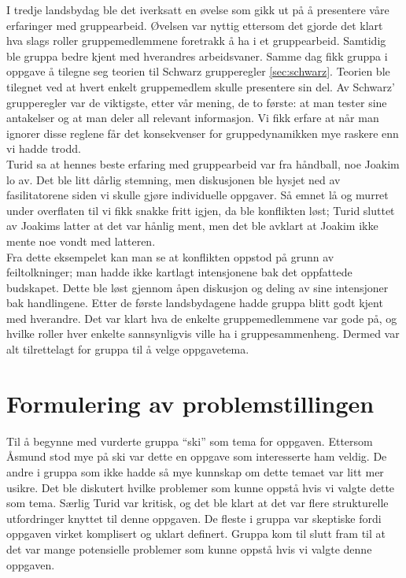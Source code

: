 I tredje landsbydag ble det iverksatt en øvelse som gikk ut på å presentere våre
erfaringer med gruppearbeid. Øvelsen var nyttig ettersom det gjorde det klart
hva slags roller gruppemedlemmene foretrakk å ha i et gruppearbeid. Samtidig ble
gruppa bedre kjent med hverandres arbeidsvaner. Samme dag fikk gruppa i oppgave
å tilegne seg teorien til Schwarz grupperegler \cref{sec:schwarz}. Teorien ble
tilegnet ved at hvert enkelt gruppemedlem skulle presentere sin del. Av
Schwarz’ grupperegler var de viktigste, etter vår mening, de to første: at
man tester sine antakelser og at man deler all relevant informasjon.  Vi fikk
erfare at når man ignorer disse reglene får det konsekvenser for
gruppedynamikken mye raskere enn vi hadde trodd. \\

Turid sa at hennes beste erfaring med gruppearbeid var fra håndball, noe Joakim
lo av. Det ble litt dårlig stemning, men diskusjonen ble hysjet ned av
fasilitatorene siden vi skulle gjøre individuelle oppgaver. Så emnet lå og
murret under overflaten til vi fikk snakke fritt igjen, da ble konflikten løst;
Turid sluttet av Joakims latter at det var hånlig ment, men det ble avklart at
Joakim ikke mente noe vondt med latteren.\\

Fra dette eksempelet kan man se at konflikten oppstod på grunn av
feiltolkninger; man hadde ikke kartlagt intensjonene bak det oppfattede
budskapet. Dette ble løst gjennom åpen diskusjon og deling av sine intensjoner
bak handlingene.  Etter de første landsbydagene hadde gruppa blitt godt kjent
med hverandre. Det var klart hva de enkelte gruppemedlemmene var gode på, og
hvilke roller hver enkelte sannsynligvis ville ha i gruppesammenheng. Dermed var
alt tilrettelagt for gruppa til å velge oppgavetema.\\

\section{Formulering av problemstillingen}
Til å begynne med vurderte gruppa ``ski'' som tema for oppgaven. Ettersom Åsmund
stod mye på ski var dette en oppgave som interesserte ham veldig. De andre i
gruppa som ikke hadde så mye kunnskap om dette temaet var litt mer usikre. Det
ble diskutert hvilke problemer som kunne oppstå hvis vi valgte dette
som tema. Særlig Turid var kritisk, og det ble klart at det var flere
strukturelle utfordringer knyttet til denne oppgaven. De fleste i gruppa var
skeptiske fordi oppgaven virket komplisert og uklart definert. Gruppa kom til
slutt fram til at det var mange potensielle problemer som kunne oppstå hvis vi
valgte denne oppgaven.\\


